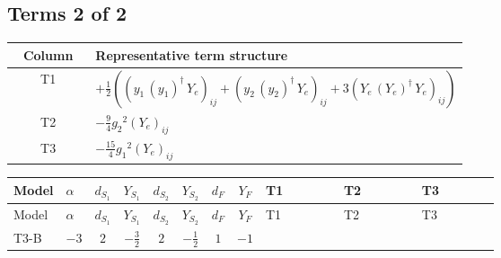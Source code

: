 \documentclass[8pt]{article}
\begin{document}
\begin{landscape}
\subsection*{Terms 2 of 2}
\begin{center}
\begin{tabular}{@{}c >{\raggedright\arraybackslash}p{0.82\linewidth}@{}}
\toprule
Column & Representative term structure \\
\midrule
T1 & \(\displaystyle +\frac{1}{2} (\left({y_1}\,\left({y_1}\right)^{\dagger}\,{Y_e}\right)_{ij}+\left({y_2}\,\left({y_2}\right)^{\dagger}\,{Y_e}\right)_{ij}+3 \left({Y_e}\,\left({Y_e}\right)^{\dagger}\,{Y_e}\right)_{ij})\) \\
\midrule
T2 & \(\displaystyle -\frac{9}{4} {g_2}^2 \left({Y_e}\right)_{ij}\) \\
\midrule
T3 & \(\displaystyle -\frac{15}{4} {g_1}^2 \left({Y_e}\right)_{ij}\) \\
\midrule
\bottomrule
\end{tabular}
\end{center}
\smallskip
\tiny
\begin{longtable}{@{}llcccccc >{\raggedright\arraybackslash}p{0.21\linewidth} >{\raggedright\arraybackslash}p{0.21\linewidth} >{\raggedright\arraybackslash}p{0.21\linewidth}@{}}
\toprule
Model & $\alpha$ & $d_{S_1}$ & $Y_{S_1}$ & $d_{S_2}$ & $Y_{S_2}$ & $d_F$ & $Y_F$ & T1 & T2 & T3 \\
\midrule
\endfirsthead
\toprule
Model & $\alpha$ & $d_{S_1}$ & $Y_{S_1}$ & $d_{S_2}$ & $Y_{S_2}$ & $d_F$ & $Y_F$ & T1 & T2 & T3 \\
\midrule
\endhead
T3-B & $-3$ & $2$ & $-\frac{3}{2}$ & $2$ & $-\frac{1}{2}$ & $1$ & $-1$ & \scriptsize\adjustbox{max width=\linewidth}{$\begin{gathered} +\frac{1}{2} (\left({y_1}\,\left({y_1}\right)^{\dagger}\,{Y_e}\right)_{ij}+\left({y_2}\,\left({y_2}\right)^{\dagger}\,{Y_e}\right)_{ij}+3 \left({Y_e}\,\left({Y_e}\right)^{\dagger}\,{Y_e}\right)_{ij})\end{gathered}$} & \scriptsize\adjustbox{max width=\linewidth}{$\begin{gathered} -\frac{9}{4} {g_2}^2 \left({Y_e}\right)_{ij}\end{gathered}$} & \scriptsize\adjustbox{max width=\linewidth}{$\begin{gathered} -\frac{15}{4} {g_1}^2 \left({Y_e}\right)_{ij}\end{gathered}$} \\
\midrule
\bottomrule
\end{longtable}
\clearpage

\end{landscape}
\end{document}
